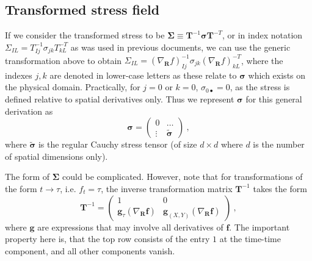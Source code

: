 \documentclass[12pt,a4paper]{article}
\begin{document}
\subsection{Transformed stress field} \label{sse:T_stress}
If we consider the transformed stress to be $\bm{\Sigma}\equiv \bm{T}^{-1}\bm{\sigma}\bm{T}^{-T}$, or in index notation $\Sigma_{IL}=T_{Ij}^{-1}\sigma_{jk}T_{kL}^{-T}$ as was used in previous documents, we can use the generic transformation above to obtain $\Sigma_{IL}=\left(\nabla_{\bm{R}}f\right)_{Ij}^{-1}\sigma_{jk}\left(\nabla_{\bm{R}}f\right)_{kL}^{-T}$, where the indexes $j,k$ are denoted in lower-case letters as these relate to $\bm{\sigma}$ which exists on the physical domain. Practically, for $j=0$ or $k=0$, $\sigma_{0\bullet} = 0$, as the stress is defined relative to spatial derivatives only. Thus we represent $\bm{\sigma}$ for this general derivation as
 \begin{equation}\label{eq:sigma_explicit}
   \bm{\sigma} = \left(\begin{array}{cc}
                   0 & \ldots \\
                   \vdots & \tilde{\bm{\sigma}}
                 \end{array}\right) \ ,
 \end{equation}
 where $\tilde{\bm{\sigma}}$ is the regular Cauchy stress tensor (of size $d\times d$ where $d$ is the number of spatial dimensions only).

 The form of $\bm{\Sigma}$ could be complicated. However, note that for transformations of the form $t\rightarrow\tau$, i.e. $f_t=\tau$, the inverse transformation matrix $\bm{T}^{-1}$ takes the form
\begin{equation}\label{eq:inverse_T}
   \bm{T}^{-1}=\left(\begin{array}{cc}
                       1 & 0 \\
                       \bm{g}_{\tau}\left(\nabla_{\bm{R}} \bm{f}\right) & \bm{g}_{\left(X,Y\right)}\left(\nabla_{\bm{R}} \bm{f}\right)
                     \end{array}\right) \ ,
\end{equation}
 where $\bm{g}$ are expressions that may involve all derivatives of $\bm{f}$. The important property here is, that the top row consists of the entry $1$ at the time-time component, and all other components vanish.
\end{document}
